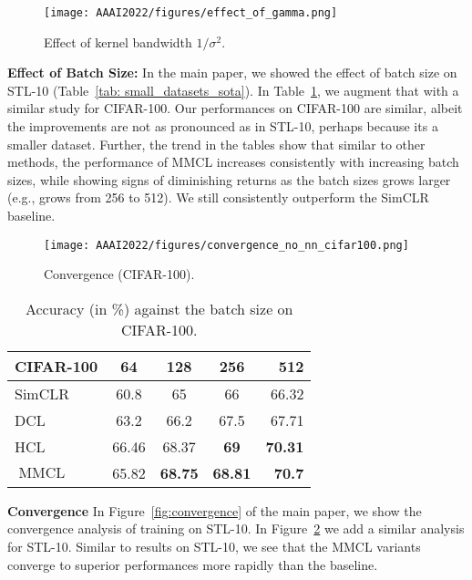 \documentclass[letterpaper]{article} \usepackage{aaai22}  \usepackage{times}  \usepackage{helvet}  \usepackage{courier}  \usepackage[hyphens]{url}  \usepackage{graphicx} \urlstyle{rm} \def\UrlFont{\rm}  \usepackage{natbib}  \usepackage{caption} \DeclareCaptionStyle{ruled}{labelfont=normalfont,labelsep=colon,strut=off} \frenchspacing  \setlength{\pdfpagewidth}{8.5in}  \setlength{\pdfpageheight}{11in}
\DeclareMathOperator*{\MMCL}{MMCL}
\begin{document}
\begin{figure}
        \centering
        \texttt{[image: AAAI2022/figures/effect\_of\_gamma.png]} \caption{Effect of kernel bandwidth $1/\sigma^2$.}
        \label{fig: main_gamma_ablation}
\end{figure}

\noindent\textbf{Effect of Batch Size:}
In the main paper, we showed the effect of batch size on STL-10 (Table~\ref{tab: small_datasets_sota}). In Table~\ref{tab: batchsize_cifar100}, we augment that with a similar study for CIFAR-100. Our performances on CIFAR-100 are similar, albeit the improvements are not as pronounced as in STL-10, perhaps because its a smaller dataset. Further, the trend in the tables show that similar to other methods, the performance of MMCL increases consistently with increasing batch sizes, while showing signs of diminishing returns as the batch sizes grows larger (e.g., grows from 256 to 512). We still consistently outperform the SimCLR baseline. 

\begin{figure}
    \centering
    \texttt{[image: AAAI2022/figures/convergence\_no\_nn\_cifar100.png]}
    \caption{Convergence (CIFAR-100).}
    \label{fig:convergence_CIFAR100}
\end{figure}
\begin{table}[]
    \centering
\begin{tabular}{lcccr}
            \toprule
            CIFAR-100  & 64 & 128 & 256 & 512 \\
            \midrule
            SimCLR  & 60.8 & 65 & 66 & 66.32  \\
            DCL  & 63.2 & 66.2 &  67.5 & 67.71 \\
            HCL  & 66.46 & 68.37 &  \textbf{69} & \textbf{70.31}\\
            \midrule
            $\MMCL$  & 65.82  & \textbf{68.75} & \textbf{68.81} & \textbf{70.7}\\
            \bottomrule
            \end{tabular}
    \caption{Accuracy (in \%) against the batch size on CIFAR-100.}
    \label{tab: batchsize_cifar100}
\end{table}

\noindent\textbf{Convergence}
In Figure~\ref{fig:convergence} of the main paper, we show the convergence analysis of training on STL-10. In Figure~\ref{fig:convergence_CIFAR100} we add a similar analysis for STL-10. Similar to results on STL-10, we see that the MMCL variants converge to superior performances more rapidly than the baseline. 
\end{document}
